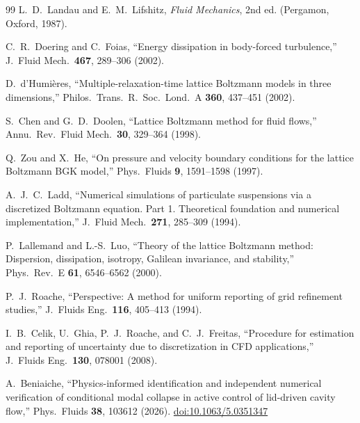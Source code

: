\documentclass[11pt,a4paper]{article}
\newenvironment{chgadd}{\par\color{blue}}{\par\color{black}}
\begin{document}
\begin{chgadd}
\begin{thebibliography}{99}
L.~D.~Landau and E.~M.~Lifshitz,
\textit{Fluid Mechanics}, 2nd ed. (Pergamon, Oxford, 1987).

C.~R.~Doering and C.~Foias,
``Energy dissipation in body-forced turbulence,''
J.\ Fluid Mech.\ \textbf{467}, 289--306 (2002).

D.~d'Humi\`eres,
``Multiple-relaxation-time lattice Boltzmann models in three dimensions,''
Philos.\ Trans.\ R.\ Soc.\ Lond.\ A \textbf{360}, 437--451 (2002).

S.~Chen and G.~D.~Doolen,
``Lattice Boltzmann method for fluid flows,''
Annu.\ Rev.\ Fluid Mech.\ \textbf{30}, 329--364 (1998).

Q.~Zou and X.~He,
``On pressure and velocity boundary conditions for the lattice Boltzmann BGK
model,'' Phys.\ Fluids \textbf{9}, 1591--1598 (1997).

A.~J.~C.~Ladd,
``Numerical simulations of particulate suspensions via a discretized Boltzmann
equation. Part 1. Theoretical foundation and numerical implementation,''
J.\ Fluid Mech.\ \textbf{271}, 285--309 (1994).

P.~Lallemand and L.-S.~Luo,
``Theory of the lattice Boltzmann method: Dispersion, dissipation, isotropy,
Galilean invariance, and stability,'' Phys.\ Rev.\ E \textbf{61}, 6546--6562
(2000).

P.~J.~Roache,
``Perspective: A method for uniform reporting of grid refinement studies,''
J.\ Fluids Eng.\ \textbf{116}, 405--413 (1994).

I.~B.~Celik, U.~Ghia, P.~J.~Roache, and C.~J.~Freitas,
``Procedure for estimation and reporting of uncertainty due to discretization in
CFD applications,'' J.\ Fluids Eng.\ \textbf{130}, 078001 (2008).

A.~Beniaiche,
``Physics-informed identification and independent numerical verification of
conditional modal collapse in active control of lid-driven cavity flow,''
Phys.\ Fluids \textbf{38}, 103612 (2026).
\href{https://doi.org/10.1063/5.0351347}{doi:10.1063/5.0351347}

\end{thebibliography}
\end{chgadd}
\end{document}

